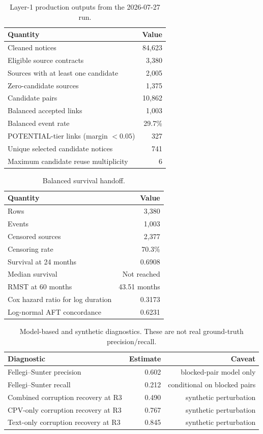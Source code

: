 \documentclass[11pt]{article}
\begin{document}
\begin{table}[h!]
\centering
\caption{Layer-1 production outputs from the 2026-07-27 run.}
\begin{tabular}{lr}
\toprule
Quantity & Value \\
\midrule
Cleaned notices & 84{,}623 \\
Eligible source contracts & 3{,}380 \\
Sources with at least one candidate & 2{,}005 \\
Zero-candidate sources & 1{,}375 \\
Candidate pairs & 10{,}862 \\
Balanced accepted links & 1{,}003 \\
Balanced event rate & 29.7\% \\
POTENTIAL-tier links (margin \(<0.05\)) & 327 \\
Unique selected candidate notices & 741 \\
Maximum candidate reuse multiplicity & 6 \\
\bottomrule
\end{tabular}
\end{table}

\begin{table}[h!]
\centering
\caption{Balanced survival handoff.}
\begin{tabular}{lr}
\toprule
Quantity & Value \\
\midrule
Rows & 3{,}380 \\
Events & 1{,}003 \\
Censored sources & 2{,}377 \\
Censoring rate & 70.3\% \\
Survival at 24 months & 0.6908 \\
Median survival & Not reached \\
RMST at 60 months & 43.51 months \\
Cox hazard ratio for log duration & 0.3173 \\
Log-normal AFT concordance & 0.6231 \\
\bottomrule
\end{tabular}
\end{table}

\begin{table}[h!]
\centering
\caption{Model-based and synthetic diagnostics. These are not real ground-truth precision/recall.}
\begin{tabular}{lrr}
\toprule
Diagnostic & Estimate & Caveat \\
\midrule
Fellegi--Sunter precision & 0.602 & blocked-pair model only \\
Fellegi--Sunter recall & 0.212 & conditional on blocked pairs \\
Combined corruption recovery at R3 & 0.490 & synthetic perturbation \\
CPV-only corruption recovery at R3 & 0.767 & synthetic perturbation \\
Text-only corruption recovery at R3 & 0.845 & synthetic perturbation \\
\bottomrule
\end{tabular}
\end{table}
\end{document}
